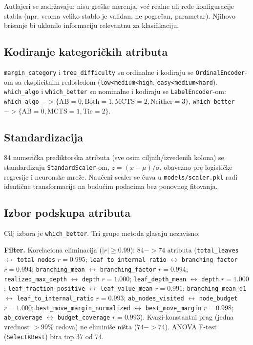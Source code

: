 \documentclass[12pt, a4paper]{article}
\begin{document}
Autlajeri se zadržavaju: nisu greške merenja, već realne ali ređe konfiguracije
stabla (npr. veoma veliko stablo je validan, ne pogrešan, parametar). Njihovo brisanje bi
uklonilo informaciju relevantnu za klasifikaciju.

\subsection{Kodiranje kategoričkih atributa}

\texttt{margin\_category} i \texttt{tree\_difficulty} su ordinalne i kodiraju se
\texttt{OrdinalEncoder}-om sa eksplicitnim redosledom (\texttt{low<medium<high},
\texttt{easy<medium<hard}). \texttt{which\_algo} i \texttt{which\_better} su nominalne i
kodiraju se \texttt{LabelEncoder}-om: \texttt{which\_algo}
$-> \{\text{AB}{=}0, \text{Both}{=}1, \text{MCTS}{=}2, \text{Neither}{=}3\}$,
\texttt{which\_better} $-> \{\text{AB}{=}0, \text{MCTS}{=}1, \text{Tie}{=}2\}$.

\subsection{Standardizacija}

84 numerička prediktorska atributa (sve osim ciljnih/izvedenih kolona) se standardizuju
\texttt{StandardScaler}-om, $z = (x-\mu)/\sigma$, obavezno pre logističke regresije i
neuronske mreže. Naučeni scaler se čuva u \texttt{models/scaler.pkl} radi identične
transformacije na budućim podacima bez ponovnog fitovanja.

\subsection{Izbor podskupa atributa}

Cilj izbora je \texttt{which\_better}. Tri grupe metoda glasaju nezavisno:

\textbf{Filter.} Korelaciona eliminacija ($|r| \geq 0.99$): $84 -> 74$ atributa
(\texttt{total\_leaves} $\leftrightarrow$ \texttt{total\_nodes} $r{=}0.995$;
\texttt{leaf\_to\_internal\_ratio} $\leftrightarrow$ \texttt{branching\_factor} $r{=}0.994$;
\texttt{branching\_mean} $\leftrightarrow$ \texttt{branching\_factor} $r{=}0.994$;
\texttt{realized\_max\_depth} $\leftrightarrow$ \texttt{depth} $r{=}1.000$;
\texttt{leaf\_depth\_mean} $\leftrightarrow$ \texttt{depth} $r{=}1.000$;
\texttt{leaf\_fraction\_positive} $\leftrightarrow$ \texttt{leaf\_value\_mean} $r{=}0.991$;
\texttt{branching\_mean\_d1} $\leftrightarrow$ \texttt{leaf\_to\_internal\_ratio} $r{=}0.993$;
\texttt{ab\_nodes\_visited} $\leftrightarrow$ \texttt{node\_budget} $r{=}1.000$;
\texttt{best\_move\_margin\_normalized} $\leftrightarrow$ \texttt{best\_move\_margin}
$r{=}0.998$; \texttt{ab\_coverage} $\leftrightarrow$ \texttt{budget\_coverage} $r{=}0.993$).
Kvazi-konstantni prag (jedna vrednost $>99\%$ redova) ne eliminiše ništa ($74 -> 74$). ANOVA
F-test (\texttt{SelectKBest}) bira top 37 od 74.
\end{document}
